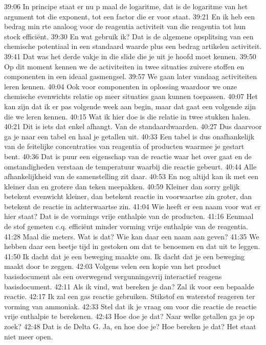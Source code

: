 39:06
In principe staat er nu p maal de logaritme, dat is de logaritme van het argument tot die exponent, tot een factor die er voor staat.
39:21
En ik heb een bedrag min rte analoog voor de reagentia activiteit van die reagentia tot hun stock efficiënt.
39:30
En wat gebruik ik? Dat is de algemene opsplitsing van een chemische potentiaal in een standaard waarde plus een bedrag artikelen activiteit.
39:41
Dat was het derde vakje in die slide die je uit je hoofd moet kennen.
39:50
Op dit moment kennen we de activiteiten in twee situaties zuivere stoffen en componenten in een ideaal gasmengsel.
39:57
We gaan later vandaag activiteiten leren kennen.
40:04
Ook voor componenten in oplossing waardoor we onze chemische evenwichts relatie op meer situaties gaan kunnen toepassen.
40:07
Het kan zijn dat ik er pas volgende week aan begin, maar dat gaat een volgende zijn die we leren kennen.
40:15
Wat ik hier doe is die relatie in twee stukken halen.
40:21
Dit is iets dat enkel afhangt. Van de standaardwaarden.
40:27
Dus daarvoor ga je naar een tabel en haal je getallen uit.
40:33
Een tabel is dus onafhankelijk van de feitelijke concentraties van reagentia of producten waarmee je gestart bent.
40:36
Dat is puur een eigenschap van de reactie waar het over gaat en de omstandigheden verstaan de temperatuur waarbij die reactie gebeurt.
40:44
Alle afhankelijkheid van de samenstelling zit daar.
40:53
En nog altijd kan ik met een kleiner dan en grotere dan teken meepakken.
40:59
Kleiner dan sorry gelijk betekent evenwicht kleiner, dan betekent reactie in voorwaartse zin groter, dan betekent de reactie in achterwaartse zin.
41:04
Wie heeft er een naam voor wat er hier staat? Dat is de vormings vrije enthalpie van de producten.
41:16
Eenmaal de stof gemeten c.q. efficiënt minder vorming vrije enthalpie van de reagentia.
41:28
Maal die meters. Wat is dat? Wie kan daar een naam aan geven?
41:35
We hebben daar een beetje tijd in gestoken om dat te benoemen en dat uit te leggen.
41:50
Ik dacht dat je een beweging maakte om. Ik dacht dat je een beweging maakt door te zeggen.
42:03
Volgens velen een kopie van het product basisdocument als een overwegend vergunningsvrij interactief reagens basisdocument.
42:11
Als ik vind, wat bereken je dan? Zal ik voor een bepaalde reactie.
42:17
Ik zal een gas reactie gebruiken. Stikstof en waterstof reageren ter vorming van ammoniak.
42:33
Stel dat ik je vraag om voor die reactie de reactie vrije enthalpie te berekenen.
42:43
Hoe doe je dat? Naar welke getallen ga je op zoek?
42:48
Dat is de Delta G. Ja, en hoe doe je? Hoe bereken je dat? Het staat niet meer open.
